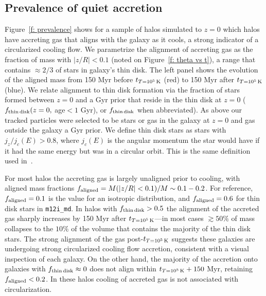 \documentclass[fleqn,usenatbib]{mnras}
\newcommand{\tcon}{t_{T=10^5\,{\rm K}}}
\begin{document}
\subsection{Prevalence of quiet accretion}
\label{s: prevalence}

Figure~\ref{f: prevalence} shows for a sample of halos simulated to $z=0$  which halos have accreting gas that aligns with the galaxy as it cools, a strong indicator of a circularized cooling flow.
We parametrize the alignment of accreting gas as the fraction of mass with $\vert z/R \vert < 0.1$ (noted on Figure~\ref{f: theta vs t}), a range that contains $\approx 2/3$ of stars in galaxy's thin disk.
The left panel shows the evolution of the aligned mass from 150 Myr before $\tcon$ (red) to 150 Myr after $\tcon$ (blue).
We relate alignment to thin disk formation via the fraction of stars formed between $z=0$ and a Gyr prior that reside in the thin disk at $z=0$ ($f_{\rm thin\,disk}(z=0,$ age$<1$ Gyr), or $f_{\rm thin\,disk}$ when abbreviated).
As above our tracked particles were selected to be stars or gas in the galaxy at $z=0$ and gas outside the galaxy a Gyr prior.
We define thin disk stars as stars with $j_z/j_c(E) > 0.8$, where $j_c(E)$ is the angular momentum the star would have if it had the same energy but was in a circular orbit.
This is the same definition used in~\cite{Yu2021}.

For most halos the accreting gas is largely unaligned prior to cooling, with aligned mass fractions $f_{\rm aligned} = M(\vert z/R \vert  <0.1)/M\sim 0.1 - 0.2$.
For reference, $f_{\rm aligned} = 0.1$ is the value for an isotropic distribution, and $f_{\rm aligned} = 0.6$ for thin disk stars in \texttt{m12i\_md}.
In halos with $f_{\rm thin\,disk} > 0.5$ the alignment of the accreted gas sharply increases by 150 Myr after $\tcon$---in most cases $\gtrsim 50\%$ of mass collapses to the $10\%$ of the volume that contains the majority of the thin disk stars.
The strong alignment of the gas post-$\tcon$ suggests these galaxies are undergoing strong circularized cooling flow accretion, consistent with a visual inspection of each galaxy.
On the other hand, the majority of the accretion onto galaxies with $f_{\rm thin\,disk} \approx 0$ does not align within $\tcon+150$ Myr, retaining $f_{\rm aligned}< 0.2$.
In these halos cooling of accreted gas is not associated with circularization.
\end{document}

